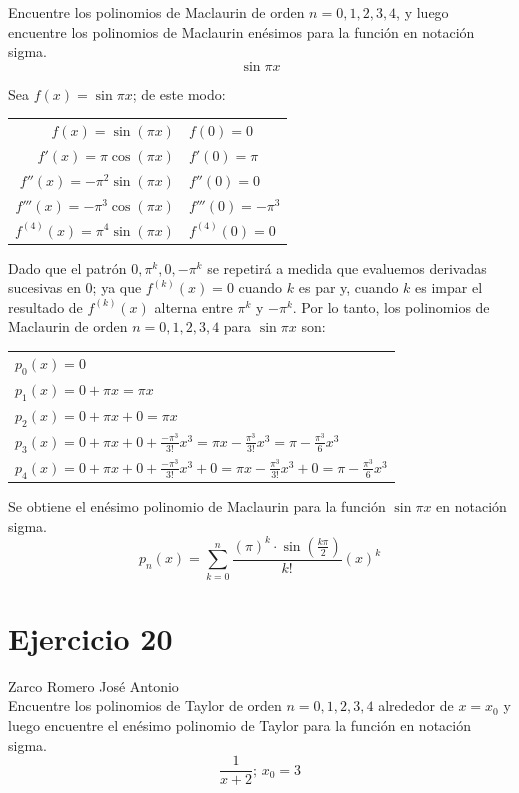 \documentclass[12pt]{article}
\begin{document}
Encuentre los polinomios de Maclaurin de orden $n = 0, 1, 2, 3, 4$, y luego encuentre los polinomios de Maclaurin enésimos para la función en notación sigma.
\[\sin \pi x\]

Sea $f(x)=\sin \pi x$; de este modo:
\begin{center}
  \begin{tabular}{r l}
    $f(x)=\sin (\pi x)$ & $f(0)=0$ \\
    $f'(x)=\pi \cos (\pi x)$ & $f'(0)=\pi$ \\
    $f''(x)= - \pi ^2 \sin (\pi x)$ & $f''(0)=0$ \\
    $f'''(x)= - \pi ^3 \cos (\pi x)$ & $f'''(0)=-\pi ^3$ \\
    $f^{(4)}(x)= \pi ^4 \sin (\pi x)$ & $f^{(4)}(0)=0$ \\
  \end{tabular}
\end{center}
Dado que el patrón $0, \pi ^k, 0, -\pi ^k$ se repetirá a medida que evaluemos derivadas sucesivas en 0; ya que $f^{(k)}(x)=0$ cuando $k$ es par y, cuando $k$ es impar el resultado de $f^{(k)}(x)$ alterna entre $\pi ^k$ y $-\pi ^k$.
Por lo tanto, los polinomios de Maclaurin de orden $n = 0, 1, 2, 3, 4$ para $\sin \pi x$ son:
\begin{center}
  \begin{tabular}{l}
    $p_0(x)=0$ \\
    $p_1(x)=0+\pi x=\pi x$ \\
    $p_2(x)=0+\pi x+0=\pi x$ \\
    $p_3(x)=0+\pi x+0+\frac{-\pi ^3}{3!}x^3=\pi x- \frac{\pi ^3}{3!}x^3=\pi - \frac{\pi ^3}{6}x^3$ \\
    $p_4(x)=0+\pi x+0+\frac{-\pi ^3}{3!}x^3+0=\pi x - \frac{\pi ^3}{3!}x^3+0=\pi - \frac{\pi ^3}{6}x^3$ \\
  \end{tabular}
\end{center}
Se obtiene el enésimo polinomio de Maclaurin para la función $\sin \pi x$ en notación sigma.
\[
p_n(x)=\sum_{k=0}^{n} \frac{(\pi)^k \cdot \sin(\frac{k \pi }{2})}{k!}(x)^k
\]

\section{Ejercicio 20} Zarco Romero José Antonio \\

Encuentre los polinomios de Taylor de orden $n = 0, 1, 2, 3, 4$ alrededor de $x = x_0$ y luego encuentre el enésimo polinomio de Taylor para la función en notación sigma.
\[\frac{1}{x+2}\text{; }x_0=3\]
\end{document}
